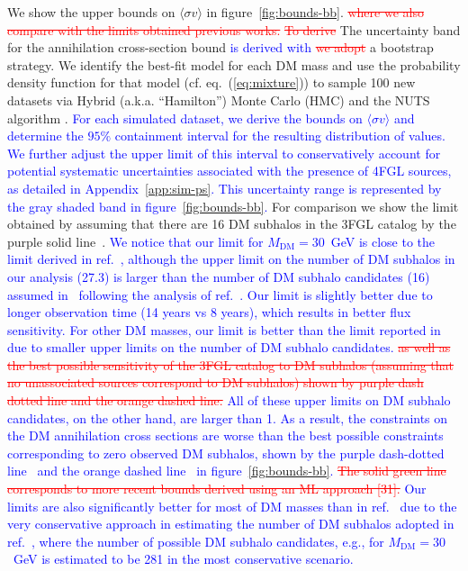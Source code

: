 \documentclass[12pt, a4paper]{article}
\newcommand{\new}[1]{\textcolor{blue}{#1}}
\newcommand{\old}[1]{\textcolor{red}{\st{#1}}}
\newcommand{\sigmav}{\langle \sigma v \rangle}
\newcommand{\mdm}{{M_\textrm{DM}}}
\begin{document}
We show the upper bounds on $\sigmav$ in figure~\ref{fig:bounds-bb}.
\old{where we also compare with the limits
obtained previous works.}
\old{To derive} The uncertainty band for the annihilation cross-section bound \new{is derived with} \old{we adopt} a bootstrap strategy. 
We identify the best-fit model for each DM mass and  use the probability density function for that model (cf. eq.~(\ref{eq:mixture})) to sample 100 new datasets via Hybrid (a.k.a. ``Hamilton'') Monte Carlo (HMC) \cite{2017arXiv170102434B} and the NUTS algorithm \cite{2011arXiv1111.4246H}. 
\new{For each simulated dataset, we derive the bounds on $\langle \sigma v \rangle$ and determine the $95\%$ containment interval for the resulting distribution of values. We further adjust the upper limit of this interval to conservatively account for potential systematic uncertainties associated with the presence of 4FGL sources, as detailed in Appendix~\ref{app:sim-ps}. This uncertainty range is represented by the gray shaded band in figure~\ref{fig:bounds-bb}.}
For comparison we show the limit obtained by assuming that there are 16 DM subhalos in the 3FGL catalog by the purple solid line~\cite{2019Galax...7...90C}.
\new{We notice that our limit for $\mdm = 30$~GeV is close to the limit derived in ref.~\cite{2019Galax...7...90C}, although the upper limit on the number of DM subhalos in our analysis (27.3) is larger than the number of DM subhalo candidates (16) assumed in~\cite{2019Galax...7...90C} following the analysis of ref.~\cite{2019JCAP...07..020C}.
Our limit is slightly better due to longer observation time (14 years vs 8 years), which results in better flux sensitivity.
For other DM masses, 
our limit is better than the limit reported in~\cite{2019Galax...7...90C} due to smaller upper limits on the number of DM subhalo candidates.}
\old{as well as the best possible sensitivity of the 3FGL catalog to DM subhalos (assuming that no unassociated sources correspond to DM subhalos) shown by purple dash dotted line and the orange dashed line.}
\new{All of these upper limits on DM subhalo candidates, on the other hand, are larger than 1. As a result, the constraints on the DM annihilation cross sections are worse than the best possible constraints corresponding to zero observed DM subhalos, shown by the purple dash-dotted line~\cite{2019Galax...7...90C} and the orange dashed line~\cite{2019JCAP...11..045C} in figure~\ref{fig:bounds-bb}.}
\old{The solid green line corresponds to more recent bounds derived using an ML approach [31].}
\new{
Our limits are also significantly better for most of DM masses than in ref.~\cite{2023JCAP...07..033B} due to the very conservative approach in estimating the number of DM subhalos adopted in ref.~\cite{2023JCAP...07..033B}, where the number of possible DM subhalo candidates, e.g., for $\mdm = 30$~GeV is estimated to be 281 in the most conservative scenario.}
\end{document}
